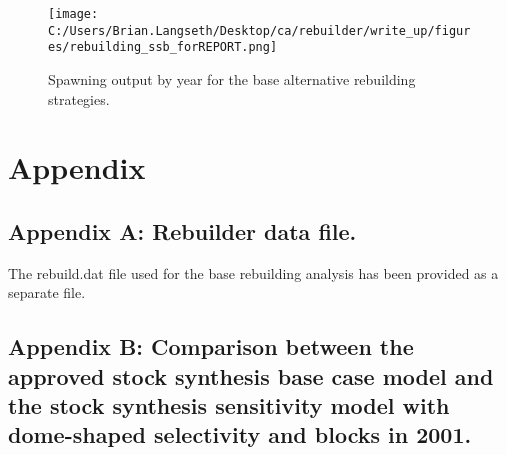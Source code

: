 \documentclass[11pt,
  english,
  a4paper,
]{article}
\begin{document}
\begin{figure}
\centering
\texttt{[image: C:/Users/Brian.Langseth/Desktop/ca/rebuilder/write\_up/figures/rebuilding\_ssb\_forREPORT.png]}
\caption{Spawning output by year for the base alternative rebuilding strategies.\label{fig:ssb-fig}}
\end{figure}

\tagmcend\tagstructend

\clearpage


\hypertarget{appendix}{%
\section{Appendix}\label{appendix}}

\leavevmode\tagmcend\tagstructend


\hypertarget{append_a}{%
\subsection{Appendix A: Rebuilder data file.}\label{append_a}}

\leavevmode\tagmcend\tagstructend


The rebuild.dat file used for the base rebuilding analysis has been provided as a separate file.

\leavevmode\tagmcend\tagstructend\par

\clearpage


\hypertarget{append_b}{%
\subsection{Appendix B: Comparison between the approved stock synthesis base case model and the stock synthesis sensitivity model with dome-shaped selectivity and blocks in 2001.}\label{append_b}}

\leavevmode\tagmcend\tagstructend



\end{document}
